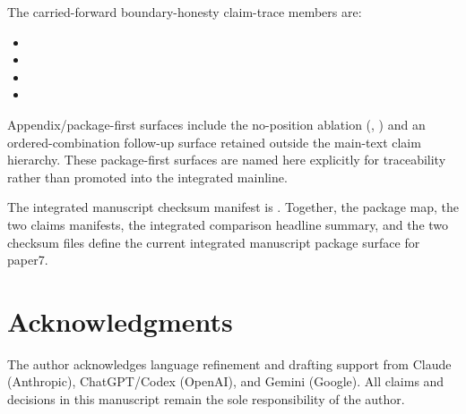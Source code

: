 \documentclass[11pt,a4paper]{article}
\begin{document}
The carried-forward boundary-honesty claim-trace members are:
\begin{itemize}
  \item {}
  \item {}
  \item {}
  \item {}
\end{itemize}

Appendix/package-first surfaces include the no-position ablation
(, )
and an ordered-combination follow-up surface retained outside the main-text claim hierarchy. These package-first surfaces are named here explicitly for traceability rather than promoted into the integrated mainline.

The integrated manuscript checksum manifest is
. Together, the
package map, the two claims manifests, the integrated comparison headline
summary, and the two checksum files define the current integrated manuscript
package surface for paper7.

\section*{Acknowledgments}
The author acknowledges language refinement and drafting support from Claude
(Anthropic), ChatGPT/Codex (OpenAI), and Gemini (Google). All claims and
decisions in this manuscript remain the sole responsibility of the author.
\end{document}
